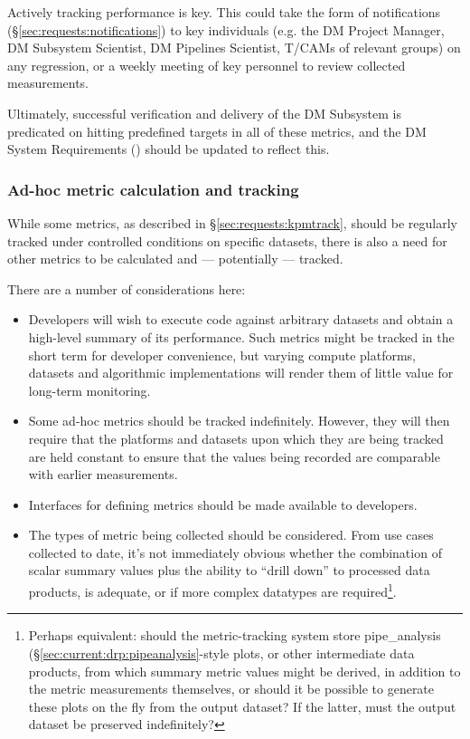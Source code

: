 \documentclass[DM,authoryear,toc,lsstdraft]{lsstdoc}
\begin{document}
Actively tracking performance is key. This could take the form of
notifications (\S\ref{sec:requests:notifications}) to key individuals (e.g.
the DM Project Manager, DM Subsystem Scientist, DM Pipelines Scientist, T/CAMs
of relevant groups) on any regression, or a weekly meeting of key personnel to
review collected measurements.

Ultimately, successful verification and delivery of the DM Subsystem is
predicated on hitting predefined targets in all of these metrics, and the DM
System Requirements () should be updated to reflect this.

\subsubsection{Ad-hoc metric calculation and tracking}
\label{sec:requests:adhoctrack}

While some metrics, as described in \S\ref{sec:requests:kpmtrack}, should be
regularly tracked under controlled conditions on specific datasets, there is
also a need for other metrics to be calculated and --- potentially ---
tracked.

There are a number of considerations here:

\begin{itemize}

  \item{Developers will wish to execute code against arbitrary datasets and
  obtain a high-level summary of its performance. Such metrics might be
  tracked in the short term for developer convenience, but varying compute
  platforms, datasets and algorithmic implementations will render them of
  little value for long-term monitoring.}

  \item{Some ad-hoc metrics should be tracked indefinitely. However, they will
  then require that the platforms and datasets upon which they are being
  tracked are held constant to ensure that the values being recorded are
  comparable with earlier measurements.}

  \item{Interfaces for defining metrics should be made available to
  developers.}

  \item{The types of metric being collected should be considered. From use
  cases collected to date, it's not immediately obvious whether the
  combination of scalar summary values plus the ability to “drill down” to
  processed data products, is adequate, or if more complex datatypes are
  required\footnote{Perhaps equivalent: should the metric-tracking system
  store pipe\_analysis (\S\ref{sec:current:drp:pipeanalysis}-style plots, or
  other intermediate data products, from which summary metric values might be
  derived, in addition to the metric measurements themselves, or should it be
  possible to generate these plots on the fly from the output dataset? If the
  latter, must the output dataset be preserved indefinitely?}.}

\end{itemize}
\end{document}
